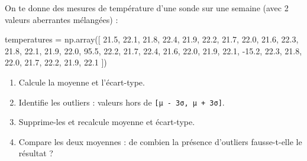 \documentclass[
  french,
  11pt,
  a4paper,
]{scrbook}
\newenvironment{Shaded}{}{}
\newcommand{\FloatTok}[1]{\textcolor[rgb]{0.00,0.36,0.77}{#1}}
\newcommand{\NormalTok}[1]{\textcolor[rgb]{0.14,0.16,0.18}{#1}}
\newcommand{\OperatorTok}[1]{\textcolor[rgb]{0.14,0.16,0.18}{#1}}
\providecommand{\tightlist}{%
  \setlength{\itemsep}{0pt}\setlength{\parskip}{0pt}}
\begin{document}
\begin{tcolorbox}[enhanced jigsaw, arc=.35mm, bottomrule=.15mm, bottomtitle=1mm, breakable, colback=white, colbacktitle=quarto-callout-note-color!10!white, colframe=quarto-callout-note-color-frame, coltitle=black, left=2mm, leftrule=.75mm, opacityback=0, opacitybacktitle=0.6, rightrule=.15mm, title={📝 Énoncé}, titlerule=0mm, toprule=.15mm, toptitle=1mm]

On te donne des mesures de température d'une sonde sur une semaine (avec
2 valeurs aberrantes mélangées) :

\begin{Shaded}
\begin{Highlighting}[]
\NormalTok{temperatures }\OperatorTok{=}\NormalTok{ np.array([}
    \FloatTok{21.5}\NormalTok{, }\FloatTok{22.1}\NormalTok{, }\FloatTok{21.8}\NormalTok{, }\FloatTok{22.4}\NormalTok{, }\FloatTok{21.9}\NormalTok{, }\FloatTok{22.2}\NormalTok{, }\FloatTok{21.7}\NormalTok{, }\FloatTok{22.0}\NormalTok{, }\FloatTok{21.6}\NormalTok{, }\FloatTok{22.3}\NormalTok{,}
    \FloatTok{21.8}\NormalTok{, }\FloatTok{22.1}\NormalTok{, }\FloatTok{21.9}\NormalTok{, }\FloatTok{22.0}\NormalTok{, }\FloatTok{95.5}\NormalTok{, }\FloatTok{22.2}\NormalTok{, }\FloatTok{21.7}\NormalTok{, }\FloatTok{22.4}\NormalTok{, }\FloatTok{21.6}\NormalTok{, }\FloatTok{22.0}\NormalTok{,}
    \FloatTok{21.9}\NormalTok{, }\FloatTok{22.1}\NormalTok{, }\OperatorTok{{-}}\FloatTok{15.2}\NormalTok{, }\FloatTok{22.3}\NormalTok{, }\FloatTok{21.8}\NormalTok{, }\FloatTok{22.0}\NormalTok{, }\FloatTok{21.7}\NormalTok{, }\FloatTok{22.2}\NormalTok{, }\FloatTok{21.9}\NormalTok{, }\FloatTok{22.1}
\NormalTok{])}
\end{Highlighting}
\end{Shaded}

\begin{enumerate}
\def\labelenumi{\arabic{enumi}.}
\tightlist
\item
  Calcule la moyenne et l'écart-type.
\item
  Identifie les outliers : valeurs hors de
  \texttt{{[}μ\ -\ 3σ,\ μ\ +\ 3σ{]}}.
\item
  Supprime-les et recalcule moyenne et écart-type.
\item
  Compare les deux moyennes : de combien la présence d'outliers
  fausse-t-elle le résultat ?
\end{enumerate}

\end{tcolorbox}
\end{document}
